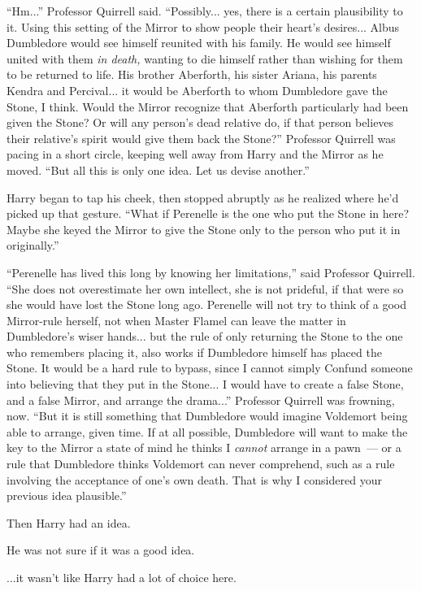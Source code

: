 ``Hm...'' Professor Quirrell said. ``Possibly... yes, there is a certain plausibility to it. Using this setting of the Mirror to show people their heart's desires... Albus Dumbledore would see himself reunited with his family. He would see himself united with them \emph{in death,} wanting to die himself rather than wishing for them to be returned to life. His brother Aberforth, his sister Ariana, his parents Kendra and Percival... it would be Aberforth to whom Dumbledore gave the Stone, I think. Would the Mirror recognize that Aberforth particularly had been given the Stone? Or will any person's dead relative do, if that person believes their relative's spirit would give them back the Stone?'' Professor Quirrell was pacing in a short circle, keeping well away from Harry and the Mirror as he moved. ``But all this is only one idea. Let us devise another.''

Harry began to tap his cheek, then stopped abruptly as he realized where he'd picked up that gesture. ``What if Perenelle is the one who put the Stone in here? Maybe she keyed the Mirror to give the Stone only to the person who put it in originally.''

``Perenelle has lived this long by knowing her limitations,'' said Professor Quirrell. ``She does not overestimate her own intellect, she is not prideful, if that were so she would have lost the Stone long ago. Perenelle will not try to think of a good Mirror-rule herself, not when Master Flamel can leave the matter in Dumbledore's wiser hands... but the rule of only returning the Stone to the one who remembers placing it, also works if Dumbledore himself has placed the Stone. It would be a hard rule to bypass, since I cannot simply Confund someone into believing that they put in the Stone... I would have to create a false Stone, and a false Mirror, and arrange the drama...'' Professor Quirrell was frowning, now. ``But it is still something that Dumbledore would imagine Voldemort being able to arrange, given time. If at all possible, Dumbledore will want to make the key to the Mirror a state of mind he thinks I \emph{cannot} arrange in a pawn~--- or a rule that Dumbledore thinks Voldemort can never comprehend, such as a rule involving the acceptance of one's own death. That is why I considered your previous idea plausible.''

Then Harry had an idea.

He was not sure if it was a good idea.

...it wasn't like Harry had a lot of choice here.

